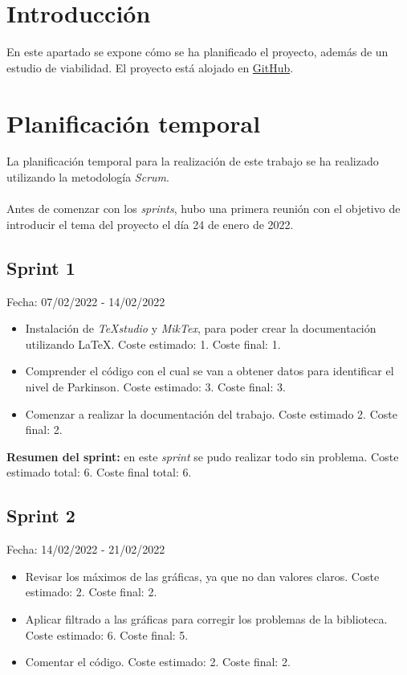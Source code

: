 
\section{Introducción}
En este apartado se expone cómo se ha planificado el proyecto, además de un estudio de viabilidad. El proyecto está alojado en \href{https://github.com/xam1002/TFG_Deteccion_Parkinson}{GitHub}.

\section{Planificación temporal}
La planificación temporal para la realización de este trabajo se ha realizado utilizando la metodología \textit{Scrum}.\\
\\
Antes de comenzar con los \textit{sprints}, hubo una primera reunión con el objetivo de introducir el tema del proyecto el día 24 de enero de 2022.

\subsection{Sprint 1}
Fecha: 07/02/2022 - 14/02/2022
\begin{itemize}
	\item Instalación de \textit{TeXstudio} y \textit{MikTex}, para poder crear la documentación utilizando \LaTeX{}. Coste estimado: 1. Coste final: 1.
	\item Comprender el código con el cual se van a obtener datos para identificar el nivel de Parkinson. Coste estimado: 3. Coste final: 3.
	\item Comenzar a realizar la documentación del trabajo. Coste estimado 2. Coste final: 2.
\end{itemize}

\textbf{Resumen del sprint:} en este \textit{sprint} se pudo realizar todo sin problema. Coste estimado total: 6. Coste final total: 6.

\subsection{Sprint 2}
Fecha: 14/02/2022 - 21/02/2022
\begin{itemize}
	\item Revisar los máximos de las gráficas, ya que no dan valores claros. Coste estimado: 2. Coste final: 2. 
	\item Aplicar filtrado a las gráficas para corregir los problemas de la biblioteca. Coste estimado: 6. Coste final: 5.
	\item Comentar el código. Coste estimado: 2. Coste final: 2.
\end{itemize}

